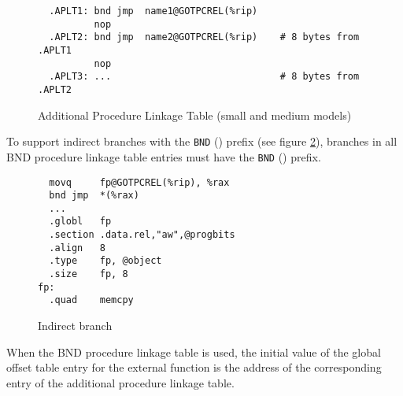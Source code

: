\begin{figure}[H]
\Hrule
\caption{Additional Procedure Linkage Table (small and medium models)}
\label{ext_small_med_plt}
\begin{footnotesize}
\begin{verbatim}
  .APLT1: bnd jmp  name1@GOTPCREL(%rip)
          nop
  .APLT2: bnd jmp  name2@GOTPCREL(%rip)    # 8 bytes from .APLT1
          nop
  .APLT3: ...                              # 8 bytes from .APLT2
\end{verbatim}%
\end{footnotesize}
\Hrule
\end{figure}

To support indirect branches with the \texttt{BND} () prefix
(see figure \ref{indirect_branch}), branches in all BND procedure linkage
table entries must have the \texttt{BND} () prefix.

\begin{figure}[H]
\Hrule
\caption{Indirect branch}
\label{indirect_branch}
\begin{footnotesize}
\begin{verbatim}
  movq     fp@GOTPCREL(%rip), %rax
  bnd jmp  *(%rax)
  ...
  .globl   fp
  .section .data.rel,"aw",@progbits
  .align   8
  .type    fp, @object
  .size    fp, 8
fp:
  .quad    memcpy
\end{verbatim}%
\end{footnotesize}
\Hrule
\end{figure}

When the BND procedure linkage table is used, the initial value of the
global offset table entry for the external function is the address of the
corresponding entry of the additional procedure linkage table.

